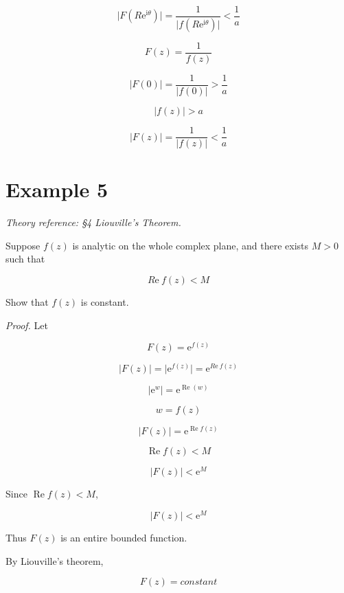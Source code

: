\documentclass[11pt,a4paper]{article}
\theoremstyle{definition}
\theoremstyle{plain}
\begin{document}
\[
\vert{}F(R\mathrm{e}^{\mathrm{i}\theta})\vert{} = \frac{1}{\vert{}f(R\mathrm{e}^{\mathrm{i}\theta})\vert{}} < \frac{1}{a}
\]

\[
F(z) = \frac{1}{f(z)}
\]

\[
\vert{}F(0)\vert{} = \frac{1}{\vert{}f(0)\vert{}} > \frac{1}{a}
\]

\[
\vert{}f(z)\vert{} > a
\]

\[
\vert{}F(z)\vert{} = \frac{1}{\vert{}f(z)\vert{}} < \frac{1}{a}
\]

\section*{Example 5}

\textit{Theory reference: §4 Liouville's Theorem.}

Suppose $f(z)$ is analytic on the whole complex plane, and there exists $M > 0$ such that

\begin{equation}
R\mathrm{e}\ f(z) < M
\end{equation}

Show that $f(z)$ is constant.

\textit{Proof.} Let

\begin{equation}
F(z) = \mathrm{e}^{f(z)}
\end{equation}

\[
\vert{}F(z)\vert{} = \vert{}\mathrm{e}^{f(z)}\vert{} = \mathrm{e}^{R\mathrm{e}\ f(z)}
\]

\[
\vert{}\mathrm{e}^{w}\vert{} = \mathrm{e}^{\operatorname{Re}(w)}
\]

\[
w = f(z)
\]

\[
\vert{}F(z)\vert{} = \mathrm{e}^{\operatorname{Re}f(z)}
\]

\[
\operatorname{Re}f(z) < M
\]

\[
\vert{}F(z)\vert{} < \mathrm{e}^{M}
\]

Since $\operatorname{Re}f(z) < M$,

\begin{equation}
\vert{}F(z)\vert{} < \mathrm{e}^{M}
\end{equation}

Thus $F(z)$ is an entire bounded function.

By Liouville’s theorem,

\begin{equation}
F(z) = constant
\end{equation}
\end{document}
